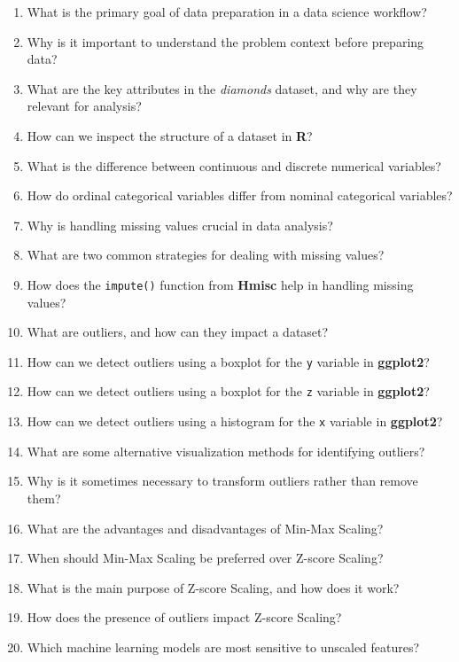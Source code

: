 \documentclass[
]{book}
\newcommand{\passthrough}[1]{#1}
\providecommand{\tightlist}{%
  \setlength{\itemsep}{0pt}\setlength{\parskip}{0pt}}
\theoremstyle{definition}
\theoremstyle{definition}
\theoremstyle{definition}
\theoremstyle{definition}
\theoremstyle{remark}
\begin{document}
\begin{enumerate}
\def\labelenumi{\arabic{enumi}.}
\tightlist
\item
  What is the primary goal of data preparation in a data science workflow?
\item
  Why is it important to understand the problem context before preparing data?
\item
  What are the key attributes in the \emph{diamonds} dataset, and why are they relevant for analysis?
\item
  How can we inspect the structure of a dataset in \textbf{R}?
\item
  What is the difference between continuous and discrete numerical variables?
\item
  How do ordinal categorical variables differ from nominal categorical variables?
\item
  Why is handling missing values crucial in data analysis?
\item
  What are two common strategies for dealing with missing values?
\item
  How does the \passthrough{\lstinline!impute()!} function from \textbf{Hmisc} help in handling missing values?
\item
  What are outliers, and how can they impact a dataset?
\item
  How can we detect outliers using a boxplot for the \passthrough{\lstinline!y!} variable in \textbf{ggplot2}?
\item
  How can we detect outliers using a boxplot for the \passthrough{\lstinline!z!} variable in \textbf{ggplot2}?
\item
  How can we detect outliers using a histogram for the \passthrough{\lstinline!x!} variable in \textbf{ggplot2}?
\item
  What are some alternative visualization methods for identifying outliers?
\item
  Why is it sometimes necessary to transform outliers rather than remove them?
\item
  What are the advantages and disadvantages of Min-Max Scaling?
\item
  When should Min-Max Scaling be preferred over Z-score Scaling?
\item
  What is the main purpose of Z-score Scaling, and how does it work?
\item
  How does the presence of outliers impact Z-score Scaling?
\item
  Which machine learning models are most sensitive to unscaled features?

\end{enumerate}
\end{document}
